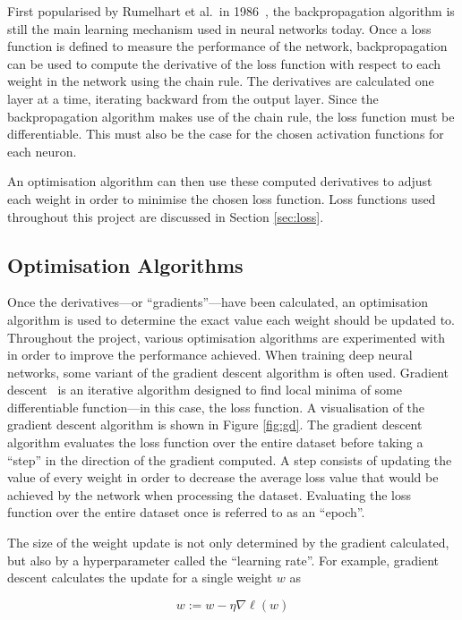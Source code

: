 First popularised by Rumelhart et al.\ in 1986~\cite{rumelhart}, the backpropagation algorithm is still the main learning mechanism used in neural networks today. Once a loss function is defined to measure the performance of the network, backpropagation can be used to compute the derivative of the loss function with respect to each weight in the network using the chain rule. The derivatives are calculated one layer at a time, iterating backward from the output layer. Since the backpropagation algorithm makes use of the chain rule, the loss function must be differentiable. This must also be the case for the chosen activation functions for each neuron.

An optimisation algorithm can then use these computed derivatives to adjust each weight in order to minimise the chosen loss function. Loss functions used throughout this project are discussed in Section \ref{sec:loss}.

\subsection{Optimisation Algorithms}

Once the derivatives---or ``gradients''---have been calculated, an optimisation algorithm is used to determine the exact value each weight should be updated to. Throughout the project, various optimisation algorithms are experimented with in order to improve the performance achieved. When training deep neural networks, some variant of the gradient descent algorithm is often used. Gradient descent~\cite[p. 536]{gradient} is an iterative algorithm designed to find local minima of some differentiable function---in this case, the loss function. A visualisation of the gradient descent algorithm is shown in Figure \ref{fig:gd}. The gradient descent algorithm evaluates the loss function over the entire dataset before taking a ``step'' in the direction of the gradient computed. A step consists of updating the value of every weight in order to decrease the average loss value that would be achieved by the network when processing the dataset. Evaluating the loss function over the entire dataset once is referred to as an ``epoch''.

The size of the weight update is not only determined by the gradient calculated, but also by a hyperparameter called the ``learning rate''. For example, gradient descent calculates the update for a single weight $w$ as

\begin{equation}
    w := w - \eta\nabla\ell(w)
\end{equation}

